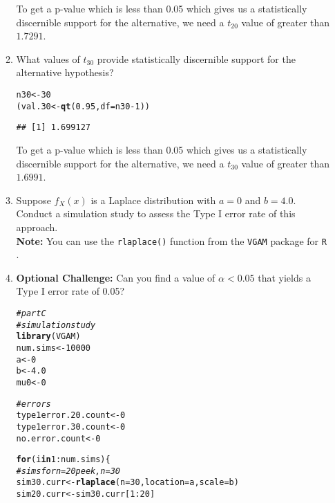 \documentclass{article}\usepackage[]{graphicx}\usepackage[]{xcolor}
\makeatletter
\newcommand{\hlnum}[1]{\textcolor[rgb]{0.686,0.059,0.569}{#1}}%
\newcommand{\hlcom}[1]{\textcolor[rgb]{0.678,0.584,0.686}{\textit{#1}}}%
\newcommand{\hlopt}[1]{\textcolor[rgb]{0,0,0}{#1}}%
\newcommand{\hldef}[1]{\textcolor[rgb]{0.345,0.345,0.345}{#1}}%
\newcommand{\hlkwa}[1]{\textcolor[rgb]{0.161,0.373,0.58}{\textbf{#1}}}%
\newcommand{\hlkwb}[1]{\textcolor[rgb]{0.69,0.353,0.396}{#1}}%
\newcommand{\hlkwc}[1]{\textcolor[rgb]{0.333,0.667,0.333}{#1}}%
\newcommand{\hlkwd}[1]{\textcolor[rgb]{0.737,0.353,0.396}{\textbf{#1}}}%
\newenvironment{kframe}{%
 \def\at@end@of@kframe{}%
 \ifinner\ifhmode%
  \def\at@end@of@kframe{\end{minipage}}%
  \begin{minipage}{\columnwidth}%
 \fi\fi%
 \def\FrameCommand##1{\hskip\@totalleftmargin \hskip-\fboxsep
 \colorbox{shadecolor}{##1}\hskip-\fboxsep
     \hskip-\linewidth \hskip-\@totalleftmargin \hskip\columnwidth}%
 \MakeFramed {\advance\hsize-\width
   \@totalleftmargin\z@ \linewidth\hsize
   \@setminipage}}%
 {\par\unskip\endMakeFramed%
 \at@end@of@kframe}
\newenvironment{knitrout}{}{} %
\makeatother
\begin{document}
\begin{enumerate}
\begin{enumerate}
To get a p-value which is less than 0.05 which gives us a statistically discernible support for the alternative, we need a $t_{20}$ value of greater than $1.7291$.


  \item What values of $t_{30}$ provide statistically discernible support for the
  alternative hypothesis?
\begin{knitrout}
\color{fgcolor}\begin{kframe}
\begin{alltt}
\hldef{n30} \hlkwb{<-} \hlnum{30}
\hldef{(val.30} \hlkwb{<-} \hlkwd{qt}\hldef{(}\hlnum{0.95}\hldef{,} \hlkwc{df} \hldef{= n30}\hlopt{-}\hlnum{1}\hldef{))}
\end{alltt}
\begin{verbatim}
## [1] 1.699127
\end{verbatim}
\end{kframe}
\end{knitrout}

To get a p-value which is less than 0.05 which gives us a statistically discernible support for the alternative, we need a $t_{30}$ value of greater than $1.6991$.


  \item Suppose $f_X(x)$ is a Laplace distribution with $a=0$ and $b=4.0$.
  Conduct a simulation study to assess the Type I error rate of this approach.\\
  \textbf{Note:} You can use the \texttt{rlaplace()} function from the \texttt{VGAM}
  package for \texttt{R} \citep{VGAM}.
  \item \textbf{Optional Challenge:} Can you find a value of $\alpha<0.05$ that yields a 
  Type I error rate of 0.05?
  
\begin{knitrout}
\color{fgcolor}\begin{kframe}
\begin{alltt}
\hlcom{# part C }
\hlcom{# simulation study}
\hlkwd{library}\hldef{(VGAM)}
\hldef{num.sims} \hlkwb{<-} \hlnum{10000}
\hldef{a} \hlkwb{<-} \hlnum{0}
\hldef{b} \hlkwb{<-} \hlnum{4.0}
\hldef{mu0} \hlkwb{<-} \hlnum{0}

\hlcom{# errors}
\hldef{type1error.20.count} \hlkwb{<-} \hlnum{0}
\hldef{type1error.30.count} \hlkwb{<-} \hlnum{0}
\hldef{no.error.count} \hlkwb{<-} \hlnum{0}

\hlkwa{for}\hldef{(i} \hlkwa{in} \hlnum{1}\hlopt{:}\hldef{num.sims)\{}
  \hlcom{# sims for n = 20 peek, n = 30}
  \hldef{sim30.curr} \hlkwb{<-} \hlkwd{rlaplace}\hldef{(}\hlkwc{n}\hldef{=}\hlnum{30}\hldef{,} \hlkwc{location} \hldef{= a,} \hlkwc{scale} \hldef{= b)}
  \hldef{sim20.curr} \hlkwb{<-} \hldef{sim30.curr[}\hlnum{1}\hlopt{:}\hlnum{20}\hldef{]}


\end{alltt}
\end{kframe}
\end{knitrout}
\end{enumerate}
\end{enumerate}
\end{document}
